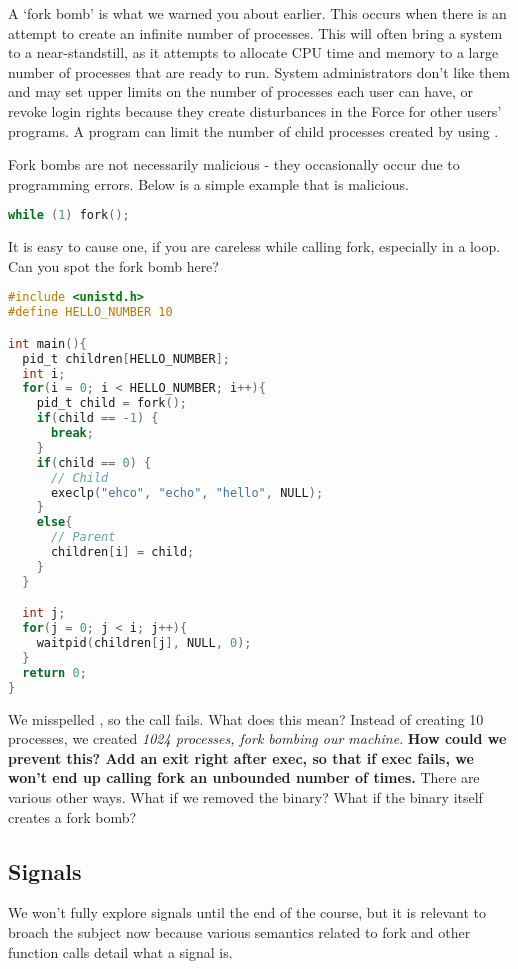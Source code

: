 A `fork bomb' is what we warned you about earlier.
This occurs when there is an attempt to create an infinite number of processes.
This will often bring a system to a near-standstill, as it attempts to allocate CPU time and memory to a large number of processes that are ready to run.
System administrators don't like them and may set upper limits on the number of processes each user can have, or revoke login rights because they create disturbances in the Force for other users' programs.
A program can limit the number of child processes created by using .

Fork bombs are not necessarily malicious - they occasionally occur due to programming errors.
Below is a simple example that is malicious.

\begin{lstlisting}[language=C]
while (1) fork();
\end{lstlisting}

It is easy to cause one, if you are careless while calling fork, especially in a loop.
Can you spot the fork bomb here?

\begin{lstlisting}[language=C]
#include <unistd.h>
#define HELLO_NUMBER 10

int main(){
  pid_t children[HELLO_NUMBER];
  int i;
  for(i = 0; i < HELLO_NUMBER; i++){
    pid_t child = fork();
    if(child == -1) {
      break;
    }
    if(child == 0) {
      // Child
      execlp("ehco", "echo", "hello", NULL);
    }
    else{
      // Parent
      children[i] = child;
    }
  }

  int j;
  for(j = 0; j < i; j++){
    waitpid(children[j], NULL, 0);
  }
  return 0;
}
\end{lstlisting}

We misspelled , so the  call fails.
What does this mean? Instead of creating 10 processes, we created \emph{1024 processes, fork bombing our machine}. \textbf{How could we prevent this? Add an exit right after exec, so that if exec fails, we won't end up calling fork an unbounded number of times.}
There are various other ways. What if we removed the  binary? What if the binary itself creates a fork bomb?

\subsection{Signals}

We won't fully explore signals until the end of the course, but it is relevant to broach the subject now because various semantics related to fork and other function calls detail what a signal is.

